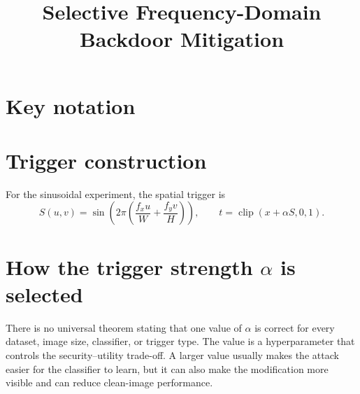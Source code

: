\documentclass[11pt]{article}
\title{Selective Frequency-Domain Backdoor Mitigation}
\author{}
\date{}
\begin{document}
\maketitle

\section*{Key notation}
\noindent{}

\section*{Trigger construction}
For the sinusoidal experiment, the spatial trigger is
\begin{equation}
    S(u,v)=\sin\left(2\pi\left(\frac{f_xu}{W}+\frac{f_yv}{H}\right)\right),
    \qquad
    t=\operatorname{clip}(x+\alpha S,0,1).
\end{equation}

\section*{How the trigger strength $\alpha$ is selected}
There is no universal theorem stating that one value of $\alpha$ is correct for
every dataset, image size, classifier, or trigger type. The value is a
hyperparameter that controls the security--utility trade-off. A larger value
usually makes the attack easier for the classifier to learn, but it can also
make the modification more visible and can reduce clean-image performance.
\end{document}

